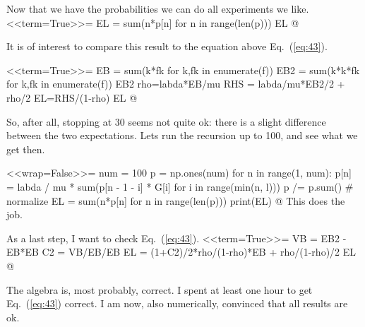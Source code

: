 \begin{question}
\begin{solution}
Now that we have the probabilities we can do all experiments we like. 
<<term=True>>=
EL = sum(n*p[n] for n in range(len(p)))
EL 
@

It is of interest to compare this result to the equation above
Eq.~(\ref{eq:43}).


<<term=True>>=
EB = sum(k*fk for k,fk in enumerate(f))
EB2 = sum(k*k*fk for k,fk in enumerate(f))
EB2
rho=labda*EB/mu
RHS = labda/mu*EB2/2 + rho/2
EL=RHS/(1-rho)
EL
@

So, after all, stopping at 30 seems not quite ok: there is a slight
difference between the two expectations. Lets run the recursion up to
100, and see what we get then.

<<wrap=False>>=
num = 100
p = np.ones(num)
for n in range(1, num):
    p[n] = labda / mu * sum(p[n - 1 - i] * G[i] for i in range(min(n, l)))
p /= p.sum()  # normalize
EL = sum(n*p[n] for n in range(len(p)))
print(EL)
@
This does the job.

As a last step, I want to check Eq.~(\ref{eq:43}).
<<term=True>>=
VB = EB2 - EB*EB
C2 = VB/EB/EB
EL = (1+C2)/2*rho/(1-rho)*EB + rho/(1-rho)/2
EL
@

The algebra is, most probably, correct. I spent at least one hour to
get Eq.~(\ref{eq:43}) correct. I am now, also numerically, convinced
that all results are ok.


\end{solution}
\end{question}




